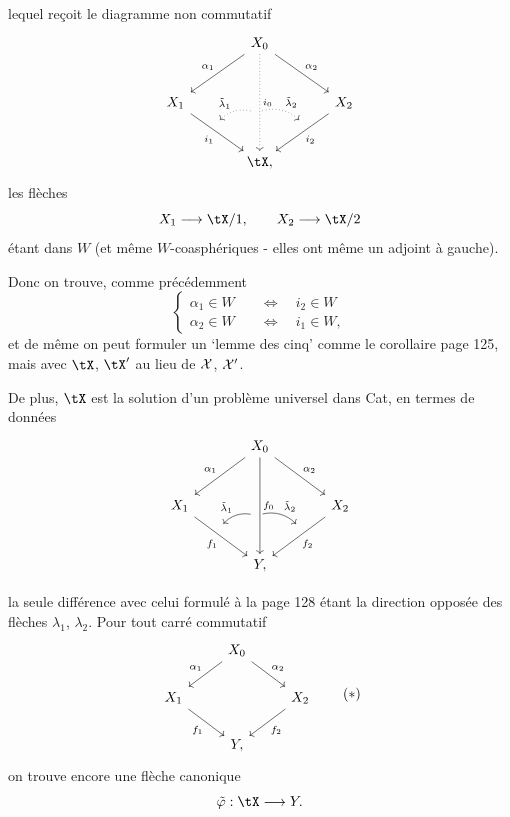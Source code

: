 lequel reçoit le diagramme non commutatif
\[
\begin{tikzcd}[row sep=large, column sep=large]
 & X_0 \arrow[dl, "\alpha_1"'] \arrow[dr, "\alpha_2"] \arrow[dd, dotted, "i_0", ""'{name=J0, pos=0.6}] & \\
X_1 \arrow[dr, "i_1"', ""{name=J1, pos=0.4}] & & X_2 \arrow[dl, "i_2", ""'{name=J2, pos=0.4}] \\
 & \tX, &
\arrow[from=J0, to=J1, dotted, bend right, "\tilde{\lambda}_1"', shorten <=2pt, shorten >=2pt]
\arrow[from=J0, to=J2, dotted, bend left, "\tilde{\lambda}_2", shorten <=2pt, shorten >=2pt]
\end{tikzcd}
\]
les flèches
\[
X_1 \longrightarrow \tX/1, \qquad X_2 \longrightarrow \tX/2
\]
étant dans $W$ (et même $W$-coasphériques - elles ont même un adjoint à gauche).

Donc on trouve, comme précédemment
\[
\left\{
\begin{aligned}
\alpha_1 \in W &\quad\iff\quad i_2 \in W \\
\alpha_2 \in W &\quad\iff\quad i_1 \in W,
\end{aligned}
\right.
\]
et de même on peut formuler un ‘lemme des cinq’ comme le corollaire page 125, mais avec $\tX$, $\tX'$ au lieu de $\mathcal{X}$, $\mathcal{X}'$.

De plus, $\tX$ est la solution d'un problème universel dans Cat, en termes de données
\[
\begin{tikzcd}[row sep=large, column sep=large]
 & X_0 \arrow[dl, "\alpha_1"'] \arrow[dr, "\alpha_2"] \arrow[dd, "f_0", ""'{name=G0, pos=0.6}] & \\
X_1 \arrow[dr, "f_1"', ""{name=G1, pos=0.4}] & & X_2 \arrow[dl, "f_2", ""'{name=G2, pos=0.4}] \\
 & Y, &
\arrow[from=G0, to=G1, bend right, "\tilde{\lambda}_1"', shorten <=2pt, shorten >=2pt]
\arrow[from=G0, to=G2, bend left, "\tilde{\lambda}_2", shorten <=2pt, shorten >=2pt]
\end{tikzcd}
\]

la seule différence avec celui formulé à la page 128 étant la direction opposée des flèches $\lambda_1$, $\lambda_2$. Pour tout carré commutatif
\[
\begin{tikzcd}
 & X_0 \arrow[dl, "\alpha_1"'] \arrow[dr, "\alpha_2"] & \\
X_1 \arrow[dr, "f_1"'] & & X_2 \arrow[dl, "f_2"] \\
 & Y, &
\end{tikzcd}
\tag*{$(*)$}
\]
on trouve encore une flèche canonique
\[
\tilde{\varphi} : \tX \longrightarrow Y.
\]

